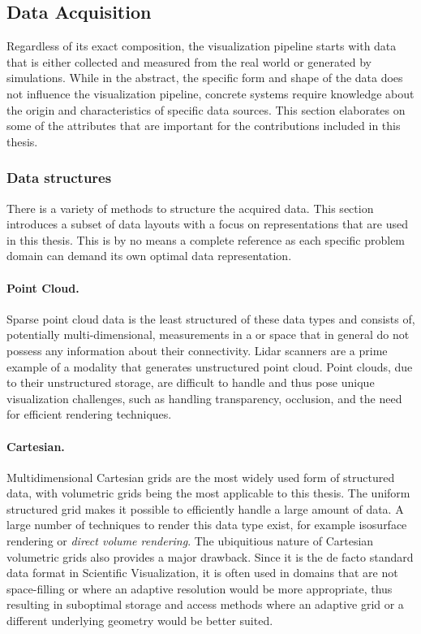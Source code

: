\subsection{Data Acquisition} \label{cha:intro:vp:da}
Regardless of its exact composition, the visualization pipeline starts with data that is either collected and measured from the real world or generated by simulations.  While in the abstract, the specific form and shape of the data does not influence the visualization pipeline, concrete systems require knowledge about the origin and characteristics of specific data sources.  This section elaborates on some of the attributes that are important for the contributions included in this thesis.

\subsubsection{Data structures} \label{cha:intro:vp:da:datastructures}
There is a variety of methods to structure the acquired data.  This section introduces a subset of data layouts with a focus on representations that are used in this thesis.  This is by no means a complete reference as each specific problem domain can demand its own optimal data representation.

\paragraph{Point Cloud. }  Sparse point cloud data is the least structured of these data types and consists of, potentially multi-dimensional, measurements in a  or  space that in general do not possess any information about their connectivity.  Lidar scanners are a prime example of a modality that generates unstructured point cloud.  Point clouds, due to their unstructured storage, are difficult to handle and thus pose unique visualization challenges, such as handling transparency, occlusion, and the need for efficient rendering techniques.

\paragraph{Cartesian. }  Multidimensional Cartesian grids are the most widely used form of structured data, with  volumetric grids being the most applicable to this thesis.  The uniform structured grid makes it possible to efficiently handle a large amount of data.  A large number of techniques to render this data type exist, for example isosurface rendering or \emph{direct volume rendering}.  The ubiquitious nature of Cartesian volumetric grids also provides a major drawback.  Since it is the de facto standard data format in Scientific Visualization, it is often used in domains that are not space-filling or where an adaptive resolution would be more appropriate, thus resulting in suboptimal storage and access methods where an adaptive grid or a different underlying geometry would be better suited.


